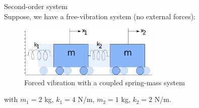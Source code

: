\begin{exmp}{Second-order system}\\
Suppose, we have a free-vibration system (no external forces):
\begin{figure}
\centering
\includegraphics[width=0.6\textwidth]{figs/massSpringDamperSystemCoupled.pdf} 
\caption{Forced vibration with a coupled spring-mass system}
\end{figure}
with $m_1=2$ kg, $k_1 = 4$ N/m, $m_2=1$ kg, $k_2 = 2$ N/m.


\end{exmp}
